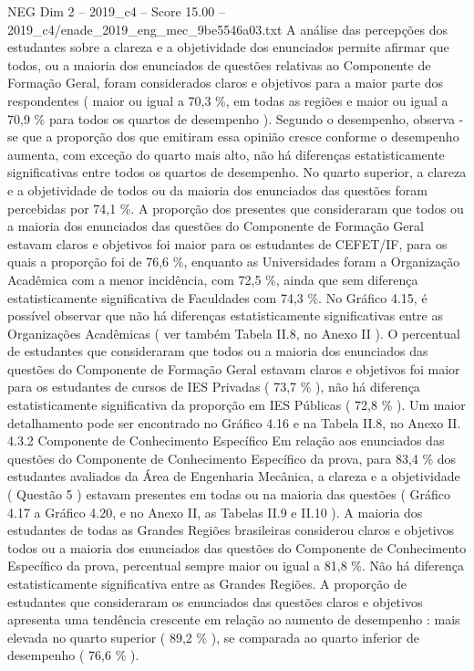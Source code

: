\begin{textsample}{NEG Dim 2 – 2019\_c4 – Score 15.00 – 2019\_c4/enade\_2019\_eng\_mec\_9be5546a03.txt}
A análise das percepções dos estudantes sobre a clareza e a objetividade dos enunciados permite afirmar que todos, ou a maioria dos enunciados de questões relativas ao Componente de Formação Geral, foram considerados claros e objetivos para a maior parte dos respondentes ( maior ou igual a 70,3 \%, em todas as regiões e maior ou igual a 70,9 \% para todos os quartos de desempenho ).
Segundo o desempenho, observa -se que a proporção dos que emitiram essa opinião cresce conforme o desempenho aumenta, com exceção do quarto mais alto, não há diferenças estatisticamente significativas entre todos os quartos de desempenho.
No quarto superior, a clareza e a objetividade de todos ou da maioria dos enunciados das questões foram percebidas por 74,1 \%.
A proporção dos presentes que consideraram que todos ou a maioria dos enunciados das questões do Componente de Formação Geral estavam claros e objetivos foi maior para os estudantes de CEFET/IF, para os quais a proporção foi de 76,6 \%, enquanto as Universidades foram a Organização Acadêmica com a menor incidência, com 72,5 \%, ainda que sem diferença estatisticamente significativa de Faculdades com 74,3 \%.
No Gráfico 4.15, é possível observar que não há diferenças estatisticamente significativas entre as Organizações Acadêmicas ( ver também Tabela II.8, no Anexo II ).
O percentual de estudantes que consideraram que todos ou a maioria dos enunciados das questões do Componente de Formação Geral estavam claros e objetivos foi maior para os estudantes de cursos de IES Privadas ( 73,7 \% ), não há diferença estatisticamente significativa da proporção em IES Públicas ( 72,8 \% ).
Um maior detalhamento pode ser encontrado no Gráfico 4.16 e na Tabela II.8, no Anexo II. 4.3.2 Componente de Conhecimento Específico Em relação aos enunciados das questões do Componente de Conhecimento Específico da prova, para 83,4 \% dos estudantes avaliados da Área de Engenharia Mecânica, a clareza e a objetividade ( Questão 5 ) estavam presentes em todas ou na maioria das questões ( Gráfico 4.17 a Gráfico 4.20, e no Anexo II, as Tabelas II.9 e II.10 ).
A maioria dos estudantes de todas as Grandes Regiões brasileiras considerou claros e objetivos todos ou a maioria dos enunciados das questões do Componente de Conhecimento Específico da prova, percentual sempre maior ou igual a 81,8 \%.
Não há diferença estatisticamente significativa entre as Grandes Regiões.
A proporção de estudantes que consideraram os enunciados das questões claros e objetivos apresenta uma tendência crescente em relação ao aumento de desempenho : mais elevada no quarto superior ( 89,2 \% ), se comparada ao quarto inferior de desempenho ( 76,6 \% ).

\end{textsample}
